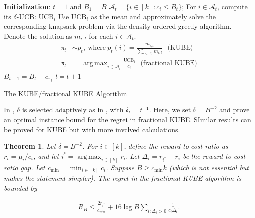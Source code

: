 \documentclass[10pt, openright]{book}
\numberwithin{equation}{section}
\theoremstyle{plain}
\newtheorem{Th}{Theorem}[section]
\theoremstyle{definition}
\DeclareMathOperator*{\argmax}{arg\,max}
\begin{document}
\begin{algorithm}[H]
 \begin{algorithmic}[1]
 \STATE \textbf{Initialization}: $t=1$ and $B_1=B$
 \STATE $\mathcal A_t = \{i\in [k]: c_i\leq B_t\}$;
\STATE For $i\in\mathcal A_t$, compute its $\delta$-UCB: $\text{UCB}_i$ 
\STATE Use $\text{UCB}_i$ as the mean and approximately solve the corresponding knapsack problem via the density-ordered greedy algorithm. Denote the solution as $m_{i,t}$ for each $i\in\mathcal A_t$.\ \ \ 
\STATE \begin{align*}
\pi_t &\sim p_t,\ \text{where}\ p_t(i)=\frac{m_{i,t}}{\sum_{i\in\mathcal A_t}m_{i,t}}  \ \ \ \text{(KUBE)} \\
\pi_t &= \argmax_{i\in\mathcal A_t}\frac{\text{UCB}_i}{c_i} \ \ \ \text{(fractional KUBE)}
\end{align*}
\STATE $B_{t+1} = B_t-c_{\pi_t}$
\STATE $t = t+1$
\ENDWHILE
\end{algorithmic}
\caption{The KUBE/fractional KUBE Algorithm} 
\label{alg:KUBE}
\end{algorithm}

In \cite{tran2012knapsack}, $\delta$ is selected adaptively as in \cite{auer2002finite}, with $\delta_t = t^{-1}$. Here, we set $\delta = B^{-2}$ and prove an optimal instance bound for the regret in fractional KUBE. SImilar results can be proved for KUBE but with more involved calculations. 

\begin{Th}\label{thm:KUBE}
Let $\delta=B^{-2}$. For $i\in [k]$, define the reward-to-cost ratio as $r_i=\mu_i/c_i$, and let $i^* = \argmax_{i\in [k]}r_i$. Let $\Delta_i = r_{i^*}-r_i$ be the reward-to-cost ratio gap. 
Let $c_{\min} = \min_{i\in [k]}c_i$. %
Suppose $B\geq c_{\min}k$ (which is not essential but makes the statement simpler). The regret in the fractional KUBE algorithm is bounded by
\end{Th}
\begin{align*}
R_B\leq\frac{2r_{i^*}}{c_{\min}}+16\log B\sum_{i: \Delta_i>0}\frac{1}{c_i\Delta_i}.
\end{align*}
\end{document}
